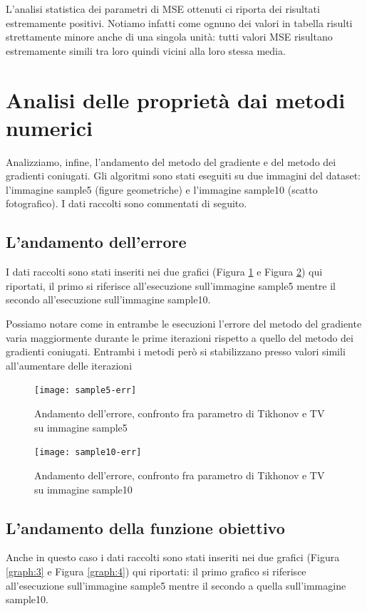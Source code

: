 \documentclass[12pt]{article}
\begin{document}
    L'analisi statistica dei parametri di MSE ottenuti ci riporta dei risultati estremamente positivi.
    Notiamo infatti come ognuno dei valori in tabella risulti strettamente minore anche di una singola unità: tutti valori MSE risultano estremamente simili tra loro quindi vicini alla loro stessa media.

    \newpage

\section{Analisi delle proprietà dai metodi numerici}
    Analizziamo, infine, l'andamento del metodo del gradiente e del metodo dei gradienti coniugati. Gli algoritmi sono stati eseguiti su due immagini del dataset: l'immagine sample5 (figure geometriche) e l'immagine sample10 (scatto fotografico).
    I dati raccolti sono commentati di seguito.

    \subsection{L'andamento dell'errore}
    I dati raccolti sono stati inseriti nei due grafici (Figura \ref{graph:1} e Figura \ref{graph:2}) qui riportati, il primo si riferisce all'esecuzione sull'immagine sample5 mentre il secondo all'esecuzione sull'immagine sample10.

    Possiamo notare come in entrambe le esecuzioni l'errore del metodo del gradiente varia maggiormente durante le prime iterazioni rispetto a quello del metodo dei gradienti coniugati. Entrambi i metodi però si stabilizzano presso valori simili all'aumentare delle iterazioni

    \begin{figure}[h!]
    \centering
    \texttt{[image: sample5-err]}
    \caption{Andamento dell'errore, confronto fra parametro di Tikhonov e TV su immagine sample5}
    \label{graph:1}
    \end{figure}

    \begin{figure}[h!]
    \centering
    \texttt{[image: sample10-err]}
    \caption{Andamento dell'errore, confronto fra parametro di Tikhonov e TV su immagine sample10}
    \label{graph:2}
    \end{figure}

    \newpage
    \subsection{L'andamento della funzione obiettivo}
    Anche in questo caso i dati raccolti sono stati inseriti nei due grafici (Figura \ref{graph:3} e Figura \ref{graph:4}) qui riportati: il primo grafico si riferisce all'esecuzione sull'immagine sample5 mentre il secondo a quella sull'immagine sample10.
\end{document}
